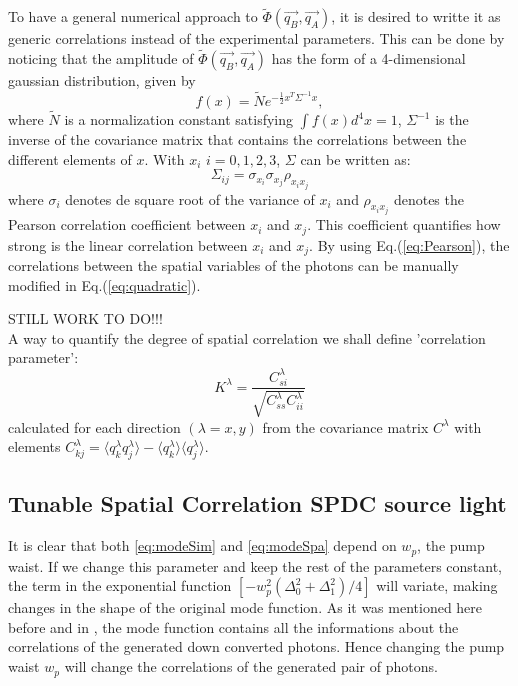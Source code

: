 To have a general numerical approach to $\tilde{\Phi}(\vec{q_B},\vec{q_A})$, it is desired to 
writte it as generic correlations instead of the experimental parameters. This can be done by 
noticing that the amplitude of $\tilde{\Phi}(\vec{q_B},\vec{q_A})$ has the form of a 4-dimensional 
gaussian distribution, given by
\begin{equation}
f(x) = \tilde{N}e^{-\frac{1}{2}x^T \Sigma^{-1}x},
\label{Gaussian}
\end{equation}
where  $\tilde{N}$ is a normalization constant satisfying $\int f(x) d^4 x = 1$, $\Sigma^{-1}$ is 
the inverse of the covariance matrix that contains the correlations between the different elements
 of $x$. With $x_i$ {$i=0,1,2,3$}, $\Sigma$ can be written as:
\begin{equation}
\Sigma_{ij} = \sigma_{x_i} \sigma_{x_j} \rho_{x_i x_j}
\label{eq:Pearson}
\end{equation}
where $\sigma_i$ denotes de square root of the variance of  $x_i$ and $\rho_{x_i x_j}$ denotes the 
Pearson correlation coefficient between $x_i$ and $x_j$. This coefficient quantifies how strong is 
the linear correlation between $x_i$ and $x_j$\cite{shafer}.
By using Eq.(\ref{eq:Pearson}), the correlations between the spatial variables of the photons 
can be manually modified in Eq.(\ref{eq:quadratic}).

STILL WORK TO DO!!! \\


A way to quantify the degree of spatial correlation we shall define 'correlation parameter':
\begin{equation}
K^\lambda = \frac{C^\lambda_{si}}{\sqrt{C^\lambda_{ss}C^\lambda_{ii}}}
\end{equation}
calculated for each direction $(\lambda = x, y)$ from the covariance matrix $C^\lambda$ with elements $C^\lambda_{kj} = \langle q^\lambda_k q^\lambda_j \rangle - \langle q^\lambda_k \rangle \langle q^\lambda_j \rangle $.



\subsection{Tunable Spatial Correlation SPDC source light}
It is clear that both \ref{eq:modeSim} and \ref{eq:modeSpa} depend on $w_p$, the pump waist. If we change this 
parameter and keep the rest of the parameters constant, the term in the exponential function $[-w_p^2 (\Delta_0^2 + \Delta_1^2 )/4]$ will variate,
making changes in the shape of the original mode function. As it was mentioned here before and in \cite{omar}, the mode function
contains all the informations about the correlations of the generated down converted photons. Hence changing the pump waist $w_p$
will change the correlations of the generated pair of photons.




